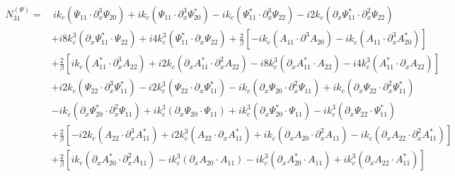 \documentclass{emulateapj}
\newcommand{\beq}{\begin{equation}}
\newcommand{\eeq}{\end{equation}}
\begin{document}
\beq
\begin{split}
N_{31}^{(\Psi)} = &  \, i k_c \left(\Psi_{11} \cdot \partial_x^3 \Psi_{20}\right) + i k_c \left(\Psi_{11} \cdot \partial_x^3\Psi_{20}^*\right) - i k_c \left(\Psi_{11}^* \cdot \partial_x^3 \Psi_{22}\right) - i 2 k_c \left(\partial_x \Psi_{11}^* \cdot \partial_x^2 \Psi_{22}\right) \\
& + i 8 k_c^3 \left(\partial_x\Psi_{11}^* \cdot \Psi_{22}\right) + i 4 k_c^3 \left(\Psi_{11}^* \cdot \partial_x \Psi_{22}\right) + \frac{2}{\beta}\left[ - i k_c \left(A_{11} \cdot \partial^3 A_{20}\right) - i k_c \left(A_{11} \cdot \partial_x^3 A_{20}^*\right) \right]\\
& + \frac{2}{\beta}\left[i k_c \left(A_{11}^* \cdot \partial_x^3 A_{22}\right) + i 2 k_c \left(\partial_x A_{11}^* \cdot \partial_x^2 A_{22}\right) - i 8 k_c^3 \left(\partial_x A_{11}^* \cdot A_{22}\right) - i 4 k_c^3 \left(A_{11}^* \cdot \partial_x A_{22}\right)\right] \\
& + i 2 k_c \left(\Psi_{22} \cdot \partial_x^3 \Psi_{11}^*\right) - i 2 k_c^3\left(\Psi_{22} \cdot \partial_x \Psi_{11}^* \right) - i k_c \left(\partial_x \Psi_{20} \cdot \partial_x^2 \Psi_{11}\right) + i k_c \left(\partial_x \Psi_{22} \cdot \partial_x^2 \Psi_{11}^*\right) \\
& - i k_c \left(\partial_x \Psi_{20}^* \cdot \partial_x^2 \Psi_{11}\right) + i k_c^3 \left(\partial_x \Psi_{20} \cdot \Psi_{11}\right) + i k_c^3 \left(\partial_x \Psi_{20}^* \cdot \Psi_{11}\right) - i k_c^3 \left(\partial_x \Psi_{22} \cdot \Psi_{11}^*\right) \\
& + \frac{2}{\beta} \left[ - i 2 k_c \left(A_{22} \cdot \partial_x^3 A_{11}^*\right) + i 2 k_c^3 \left(A_{22} \cdot \partial_x A_{11}^*\right) + i k_c \left(\partial_x A_{20} \cdot \partial_x^2 A_{11}\right) - i k_c \left(\partial_x A_{22} \cdot \partial_x^2 A_{11}^*\right) \right] \\
& + \frac{2}{\beta} \left[ i k_c \left(\partial_x A_{20}^* \cdot \partial_x^2 A_{11}\right) - i k_c^3 \left(\partial_x A_{20} \cdot A_{11}\right) - i k_c^3 \left(\partial_x A_{20}^* \cdot A_{11}\right) + i k_c^3 \left(\partial_x A_{22} \cdot A_{11}^*\right)\right]
\end{split}
\eeq
\end{document}
